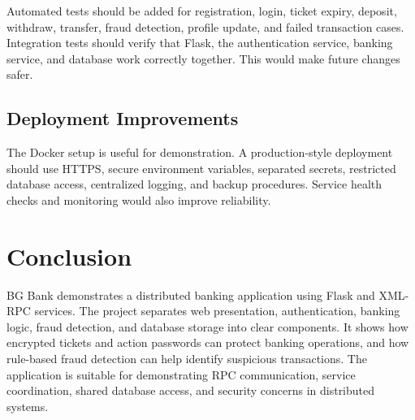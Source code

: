 \documentclass[12pt,a4paper]{article}
\newcommand{\sectionbreakguard}{\Needspace{8\baselineskip}}
\newcommand{\subsectionbreakguard}{\Needspace{5\baselineskip}}
\begin{document}
Automated tests should be added for registration, login, ticket expiry, deposit, withdraw, transfer, fraud detection, profile update, and failed transaction cases. Integration tests should verify that Flask, the authentication service, banking service, and database work correctly together. This would make future changes safer.

\subsectionbreakguard
\subsection{Deployment Improvements}

The Docker setup is useful for demonstration. A production-style deployment should use HTTPS, secure environment variables, separated secrets, restricted database access, centralized logging, and backup procedures. Service health checks and monitoring would also improve reliability.

\sectionbreakguard
\section{Conclusion}

BG Bank demonstrates a distributed banking application using Flask and XML-RPC services. The project separates web presentation, authentication, banking logic, fraud detection, and database storage into clear components. It shows how encrypted tickets and action passwords can protect banking operations, and how rule-based fraud detection can help identify suspicious transactions. The application is suitable for demonstrating RPC communication, service coordination, shared database access, and security concerns in distributed systems.
\end{document}
